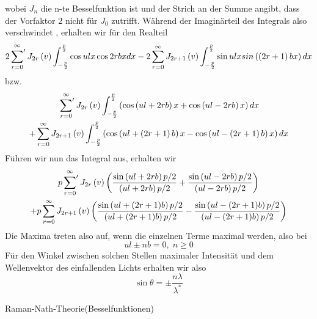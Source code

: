 wobei $J_{n}$ die n-te Besselfunktion ist und der Strich an der Summe angibt, dass der Vorfaktor $2$ nicht für $J_{0}$ zutrifft. Während der Imaginärteil des Integrals also verschwindet \cite{Raman}, erhalten wir für den Realteil
\begin{equation}
 2 \sideset{}{'} \sum_{r=0}^{\infty} J_{2r} \left( v \right) \int_{-\frac{p}{2}}^{\frac{p}{2}} \cos ulx \cos 2rbx dx - 2 \sum_{r=0}^{\infty} J_{2r+1} \left( v \right) \int_{-\frac{p}{2}}^{\frac{p}{2}} \sin ulx sin \left( \left( 2r+1 \right) bx \right) dx
\end{equation}
bzw.
\begin{multline}
 \sideset{}{'} \sum_{r=0}^{\infty} J_{2r} \left( v \right) \int_{-\frac{p}{2}}^{\frac{p}{2}} \left( \cos \left( ul + 2rb \right)x + \cos \left( ul - 2rb \right)x \right) dx \\
 + \sum_{r=0}^{\infty} J_{2r+1} \left( v \right) \int_{-\frac{p}{2}}^{\frac{p}{2}} \left( \cos \left( ul + \left(  2r+1 \right) b \right)x - \cos \left( ul - \left(  2r+1 \right) b \right)x  \right) dx
\end{multline}
Führen wir nun das Integral aus, erhalten wir
\begin{multline}
 p \sideset{}{'} \sum_{r=0}^{\infty} J_{2r} \left( v \right) \left( \frac{\sin \left(ul+2rb\right)p/2}{\left(ul+2rb\right)p/2} + \frac{\sin \left(ul-2rb\right)p/2}{\left(ul-2rb\right)p/2} \right) \\
 + p \sum_{r=0}^{\infty} J_{2r+1} \left( v \right) \left( \frac{\sin \left(ul+(2r+1)b\right)p/2}{\left(ul+(2r+1)b\right)p/2} - \frac{\sin \left(ul-(2r+1)b\right)p/2}{\left(ul-(2r+1)b\right)p/2} \right)
\end{multline}
Die Maxima treten also auf, wenn die einzelnen Terme maximal werden, also bei
\begin{equation}
 ul \pm nb = 0,\;  n \geq 0
\end{equation}
Für den Winkel zwischen solchen Stellen maximaler Intensität und dem Wellenvektor des einfallenden Lichts erhalten wir also
\begin{equation}
 \sin \theta = \pm \frac{n \lambda}{\lambda^*}
\end{equation}






Raman-Nath-Theorie(Besselfunktionen)
